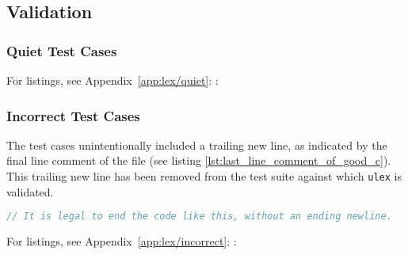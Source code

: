 \subsection{Validation}


\subsubsection{Quiet Test Cases}

For listings, see Appendix~\ref{app:lex/quiet}: :


\subsubsection{Incorrect Test Cases}

The test cases  unintentionally included a trailing new line, as indicated by the final line comment of the file (see listing \ref{lst:last_line_comment_of_good_c}). This trailing new line has been removed from the test suite against which \texttt{ulex} is validated.

\begin{lstlisting}[language=C,style=c,caption={Last line comment within \texttt{incorrect/lexer/good.c}.},label={lst:last_line_comment_of_good_c}]
// It is legal to end the code like this, without an ending newline.
\end{lstlisting}

For listings, see Appendix~\ref{app:lex/incorrect}: :

